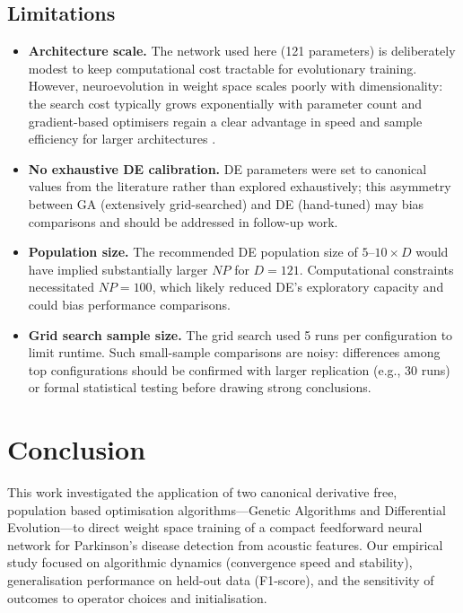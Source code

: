 \documentclass[12pt, a4paper]{article}
\begin{document}
\subsection{Limitations}
\label{sec:limitations}

\begin{itemize}
  \item \textbf{Architecture scale.} The network used here (121 parameters) is deliberately modest to keep computational cost tractable for evolutionary training. However, neuroevolution in weight space scales poorly with dimensionality: the search cost typically grows exponentially with parameter count and gradient-based optimisers regain a clear advantage in speed and sample efficiency for larger architectures \cite{yao1999}.
  \item \textbf{No exhaustive DE calibration.} DE parameters were set to canonical values from the literature rather than explored exhaustively; this asymmetry between GA (extensively grid-searched) and DE (hand-tuned) may bias comparisons and should be addressed in follow-up work.
  \item \textbf{Population size.} The recommended DE population size of $5$--$10\times D$ would have implied substantially larger $NP$ for $D=121$. Computational constraints necessitated $NP=100$, which likely reduced DE's exploratory capacity and could bias performance comparisons.
  \item \textbf{Grid search sample size.} The grid search used 5 runs per configuration to limit runtime. Such small-sample comparisons are noisy: differences among top configurations should be confirmed with larger replication (e.g., 30 runs) or formal statistical testing before drawing strong conclusions.
\end{itemize}

\section{Conclusion}

This work investigated the application of two canonical derivative free, population based optimisation algorithms—Genetic Algorithms and Differential Evolution—to direct weight space training of a compact feedforward neural network for Parkinson's disease detection from acoustic features. Our empirical study focused on algorithmic dynamics (convergence speed and stability), generalisation performance on held-out data (F1-score), and the sensitivity of outcomes to operator choices and initialisation.
\end{document}
